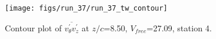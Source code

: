 \begin{figure}[H]
\centering
\texttt{[image: figs/run\_37/run\_37\_tw\_contour]}
\caption{Contour plot of $\overline{v_{\theta}^{\prime} v_{z}^{\prime}}$ at $z/c$=8.50, $V_{free}$=27.09, station 4.}
\label{fig:run_37_tw_contour}
\end{figure}


